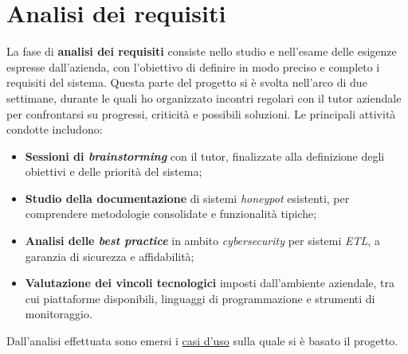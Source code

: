 \keepXColumns
\section{Analisi dei requisiti}
La fase di \textbf{analisi dei requisiti} consiste nello studio e nell'esame delle esigenze espresse dall'azienda, con l'obiettivo di definire in modo preciso e completo i requisiti del sistema.  
Questa parte del progetto si è svolta nell'arco di due settimane, durante le quali ho organizzato incontri regolari con il tutor aziendale per confrontarsi su progressi, criticità e possibili soluzioni. Le principali attività condotte includono:
\begin{itemize}
    \item \textbf{Sessioni di \textit{brainstorming}} con il tutor, finalizzate alla definizione degli obiettivi e delle priorità del sistema;
    \item \textbf{Studio della documentazione} di sistemi \textit{honeypot} esistenti, per comprendere metodologie consolidate e funzionalità tipiche;
    \item \textbf{Analisi delle \textit{best practice}} in ambito \textit{cybersecurity} per sistemi \textit{ETL}, a garanzia di sicurezza e affidabilità;
    \item \textbf{Valutazione dei vincoli tecnologici} imposti dall'ambiente aziendale, tra cui piattaforme disponibili, linguaggi di programmazione e strumenti di monitoraggio.
\end{itemize}
Dall'analisi effettuata sono emersi i \hyperref[casi-uso]{casi d'uso} sulla quale si è basato il progetto.
